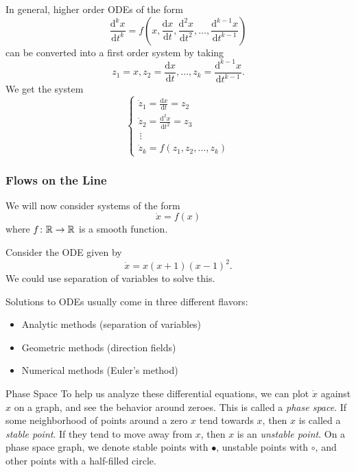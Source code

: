 \documentclass[class=article, crop=false]{standalone}
\begin{document}
  \begin{note}{}
    In general, higher order ODEs of the form
    \[
      \frac{\mathrm{d}^kx}{\mathrm{d}t^k} = f(x, \frac{\mathrm{d}x}{\mathrm{d}t}, \frac{\mathrm{d}^2x}{\mathrm{d}t^2}, \dotsc, \frac{\mathrm{d}^{k - 1}x}{\mathrm{d}t^{k - 1}})
    \]
    can be converted into a first order system by taking
    \[
      z_1 = x, z_2 = \frac{\mathrm{d}x}{\mathrm{d}t},\dotsc, z_k = \frac{\mathrm{d}^{k - 1}x}{\mathrm{d}t^{k - 1}}.
    \]
    We get the system
    \[
      \begin{cases}
        \dot{z}_1 = \frac{\mathrm{d}x}{\mathrm{d}t} = z_2 \\
        \dot{z}_2 = \frac{\mathrm{d}^2x}{\mathrm{d}t^2} = z_3 \\
        \hspace{2pt}\vdots \\
        \dot{z}_k = f(z_1, z_2,\dotsc, z_k)
      \end{cases}
    \]
  \end{note}
  \subsubsection{Flows on the Line}
  We will now consider systems of the form
  \[
    \dot{x} = f(x)
  \]
  where $f\colon \mathbb{R}\to \mathbb{R}$ is a smooth function.
  \begin{example}{}
    Consider the ODE given by
    \[
      \dot{x} = x(x + 1)(x - 1)^2.
    \]
    We could use separation of variables to solve this.
  \end{example}
  \begin{note}{}
    Solutions to ODEs usually come in three different flavors:
    \begin{itemize}
      \item Analytic methods (separation of variables)
      \item Geometric methods (direction fields)
      \item Numerical methods (Euler's method)
    \end{itemize}
  \end{note}
  \begin{definition}{Phase Space}
    To help us analyze these differential equations, we can plot $\dot{x}$ against $x$ on a graph, and see the behavior around zeroes. This is called a \emph{phase space}. If some neighborhood of points around a zero $x$ tend towards $x$, then $x$ is called a \emph{stable point}. If they tend to move away from $x$, then $x$ is an \emph{unstable point}. On a phase space graph, we denote stable points with $\bullet$, unstable points with $\circ$, and other points with a half-filled circle.
  \end{definition}
\end{document}
